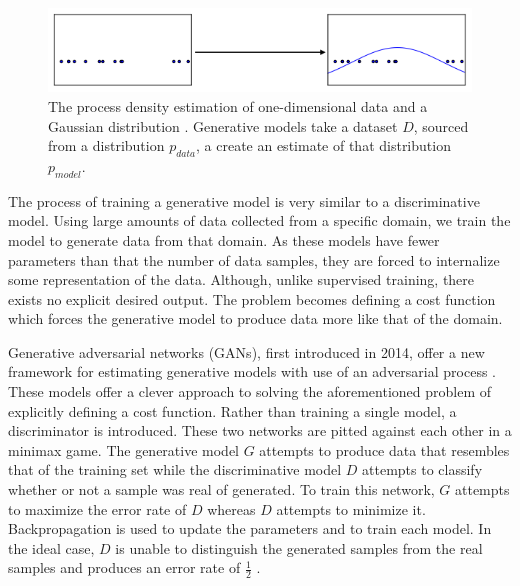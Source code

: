 \documentclass[11pt]{article}
\begin{document}
\begin{figure}
\centering
\includegraphics[scale=0.7]{pdf}
\caption{The process density estimation of one-dimensional data and a Gaussian distribution \citep{2017arXiv170100160G}. Generative models take a dataset $D$, sourced from a distribution $p_{data}$, a create an estimate of that distribution $p_{model}$.}
\label{fig:pdf}
\end{figure}

The process of training a generative model is very similar to a discriminative model. Using large amounts of data collected from a specific domain, we train the model to generate data from that domain. As these models have fewer parameters than that the number of data samples, they are forced to internalize some representation of the data. Although, unlike supervised training, there exists no explicit desired output. The problem becomes defining a cost function which forces the generative model to produce data more like that of the domain.

Generative adversarial networks (GANs), first introduced in 2014, offer a new framework for estimating generative models with use of an adversarial process \citep{2014arXiv1406.2661G}. These models offer a clever approach to solving the aforementioned problem of explicitly defining a cost function. Rather than training a single model, a discriminator is introduced. These two networks are pitted against each other in a minimax game. The generative model $G$ attempts to produce data that resembles that of the training set while the discriminative model $D$ attempts to classify whether or not a sample was real of generated. To train this network, $G$ attempts to maximize the error rate of $D$ whereas $D$ attempts to minimize it. Backpropagation is used to update the parameters and to train each model. In the ideal case, $D$ is unable to distinguish the generated samples from the real samples and produces an error rate of $\frac{1}{2}$ \citep{2014arXiv1406.2661G}.
\end{document}
